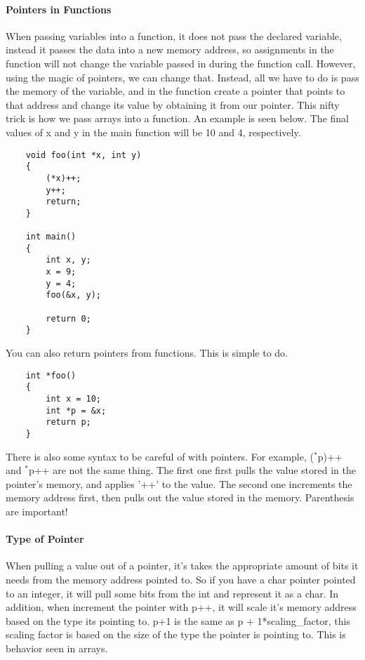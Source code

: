 \paragraph{Pointers in Functions} When passing variables into a function, it does not pass the declared variable, instead it passes the data into a new memory address, so assignments in the function will not change the variable passed in during the function call. However, using the magic of pointers, we can change that. Instead, all we have to do is pass the memory of the variable, and in the function create a pointer that points to that address and change its value by obtaining it from our pointer. This nifty trick is how we pass arrays into a function. An example is seen below. The final values of x and y in the main function will be 10 and 4, respectively.
\begin{verbatim}
	void foo(int *x, int y) 
    {
        (*x)++;
        y++;
        return;
    }
	
    int main()
    {
        int x, y;
        x = 9;
        y = 4;
        foo(&x, y);
	
        return 0;
    }
\end{verbatim}

You can also return pointers from functions. This is simple to do.
\begin{verbatim}
    int *foo()
    {
        int x = 10;
        int *p = &x;
        return p;
   	}
\end{verbatim}

There is also some syntax to be careful of with pointers. For example, ($^*$p)++ and $^*$p++ are not the same thing. The first one first pulls the value stored in the pointer's memory, and applies '++' to the value. The second one increments the memory address first, then pulls out the value stored in the memory. Parenthesis are important!
\paragraph{Type of Pointer} When pulling a value out of a pointer, it's takes the appropriate amount of bits it needs from the memory address pointed to. So if you have a char pointer pointed to an integer, it will pull some bits from the int and represent it as a char. In addition, when increment the pointer with p++, it will scale it's memory address based on the type its pointing to. p+1 is the same as p + 1*scaling\_factor, this scaling factor is based on the size of the type the pointer is pointing to. This is behavior seen in arrays.
 
